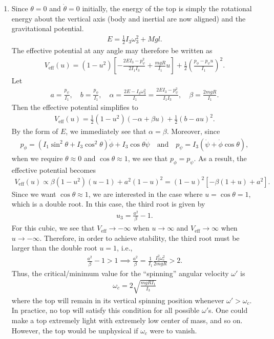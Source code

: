 \documentclass{article}
\theoremstyle{definition}
\newcommand{\al}{\alpha}
\newcommand{\be}{\beta}
\newcommand{\f}[2]{\frac{#1}{#2}}
\newcommand{\lp}{\left(}
\newcommand{\rp}{\right)}
\newcommand{\lb}{\left[}
\newcommand{\rb}{\right]}
\begin{document}
\begin{enumerate}[label=(\alph*)]
	
	\item Since $\theta = 0$ and $\dot\theta = 0$ initially, the energy of the top is simply the rotational energy about the vertical axis (body and inertial are now aligned) and the gravitational potential.
	\begin{align*}
	E = \f{1}{2}I_3 \omega_3^2 + Mgl.
	\end{align*} 
	The effective potential at any angle may therefore be written as 
	\begin{align*}
	V_\text{eff}(u) = (1-u^2)\lb -\f{2E I_3 - p_\psi^2}{2I_1 I_3} + \f{mgR}{I_1}u \rb + \f{1}{2}\lp \f{p_\phi - p_\psi u}{I_1} \rp^2.
	\end{align*}
	Let 
	\begin{align*}
	a = \f{p_\psi}{I_1}, \quad b = \f{p_\phi}{I_1}, \quad \al = \f{2E - I_3 \omega_3^2}{I_1} = \f{2E I_3 - p_\psi^2}{I_1I_3}, \quad \be = \f{2mgR}{I_1}.
	\end{align*}
	Then the effective potential simplifies to 
	\begin{align*}
	V_\text{eff}(u) = \f{1}{2}(1-u^2)( -\al + \be u ) + \f{1}{2}(b - au)^2.
	\end{align*}
	By the form of $E$, we immediately see that $\al = \be$. Moreover, since 
	\begin{align*}
	p_\phi = (I_1\sin^2\theta + I_3\cos^2\theta)\dot\phi + I_3\cos\theta\dot\psi \quad \text{and}\quad
	p_\psi = I_3(\dot\psi + \dot\phi \cos\theta),
	\end{align*}
	when we require $\theta \approx 0$ and $\cos\theta \approx 1$, we see that $p_\phi = p_\psi$. As a result, the effective potential becomes
	\begin{align*}
	V_\text{eff}(u) \propto \be(1-u^2)(u-1) + a^2(1-u)^2 = (1-u)^2 \lb -\be(1+u) + a^2 \rb.
	\end{align*} 
	Since we want $\cos\theta\approx 1$, we are interested in the case where $u=\cos\theta = 1$, which is a double root. In this case, the third root is given by 
	\begin{align*}
	u_3 = \f{a^2}{\be} - 1.
	\end{align*}
	For this cubic, we see that $V_\text{eff}\to -\infty$ when $u\to \infty$ and $V_\text{eff}\to \infty$ when $u\to -\infty$. Therefore, in order to achieve stability, the third root must be larger than the double root $u=1$, i.e., 
	\begin{align*}
	\f{a^2}{\be} - 1 > 1 \implies \f{a^2}{\be} = \f{1}{I_1} \f{I_3^2 \omega_c^2}{2mgR} > 2.
	\end{align*} 
	Thus, the critical/minimum value for the ``spinning'' angular velocity $\omega'$ is  
	\begin{align*}
	\boxed{\omega_c = 2\sqrt{\f{mgR I_1}{I_3}}}
	\end{align*}
	where the top will remain in its vertical spinning position whenever $\omega' > \omega_c$. In practice, no top will satisfy this condition for all possible $\omega'$s. One could make a top extremely light with extremely low center of mass, and so on. However, the top would be unphysical if $\omega_c$ were to vanish.  
\end{enumerate}
\end{document}
